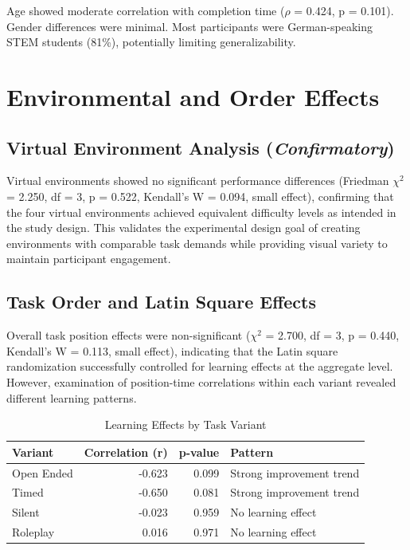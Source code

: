 Age showed moderate correlation with completion time ($\rho$ = 0.424, p = 0.101). Gender differences were minimal. Most participants were German-speaking STEM students (81\%), potentially limiting generalizability.

\section{Environmental and Order Effects}\label{sec:env-order-effects}

\subsection{Virtual Environment Analysis (\textit{Confirmatory})}

Virtual environments showed no significant performance differences (Friedman $\chi^2$ = 2.250, df = 3, p = 0.522, Kendall's W = 0.094, small effect), confirming that the four virtual environments achieved equivalent difficulty levels as intended in the study design. This validates the experimental design goal of creating environments with comparable task demands while providing visual variety to maintain participant engagement.

\subsection{Task Order and Latin Square Effects}

Overall task position effects were non-significant ($\chi^2$ = 2.700, df = 3, p = 0.440, Kendall's W = 0.113, small effect), indicating that the Latin square randomization successfully controlled for learning effects at the aggregate level. However, examination of position-time correlations within each variant revealed different learning patterns.

\begin{table}[h]
\centering
\caption{Learning Effects by Task Variant}
\label{tab:learning_effects}
\begin{tabular}{lrrl}
\toprule
\textbf{Variant} & \textbf{Correlation (r)} & \textbf{p-value} & \textbf{Pattern} \\
\midrule
Open Ended & -0.623 & 0.099 & Strong improvement trend \\
Timed & -0.650 & 0.081 & Strong improvement trend \\
Silent & -0.023 & 0.959 & No learning effect \\
Roleplay & 0.016 & 0.971 & No learning effect \\
\bottomrule
\end{tabular}
\end{table}

